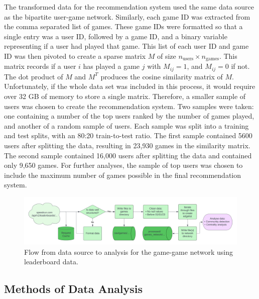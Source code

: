 The transformed data for the recommendation system used the same data source as the bipartite user-game network. Similarly, each game ID was extracted from the comma separated list of games. These game IDs were formatted so that a single entry was a user ID, followed by a game ID, and a binary variable representing if a user had played that game. This list of each user ID and game ID was then pivoted to create a sparse matrix $M$ of size $n_{\text{users}} \times n_{\text{games}}$. This matrix records if a user $i$ has played a game $j$ with $M_{ij} = 1$, and $M_{ij} = 0$ if not. The dot product of $M$ and $M^T$ produces the cosine similarity matrix of $M$. Unfortunately, if the whole data set was included in this process, it would require over 32 GB of memory to store a single matrix. Therefore, a smaller sample of users was chosen to create the recommendation system. Two samples were taken: one containing a number of the top users ranked by the number of games played, and another of a random sample of users. Each sample was split into a training and test splits, with an 80:20 train-to-test ratio. The first sample contained 5600 users after splitting the data, resulting in 23,930 games in the similarity matrix. The second sample contained 16,000 users after splitting the data and contained only 9,650 games. For further analyses, the sample of top users was chosen to include the maximum number of games possible in the final recommendation system.

\vspace{-10pt}
\begin{figure}[h]
    \centering
    \hspace*{-1cm}\includegraphics[width=1.1\linewidth]{images/leaderboard-process-2.png}
    \caption{Flow from data source to analysis for the game-game network using leaderboard data.}
    \label{fig:my_label}
\end{figure}
\vspace{-10pt}

\subsection{Methods of Data Analysis} 

